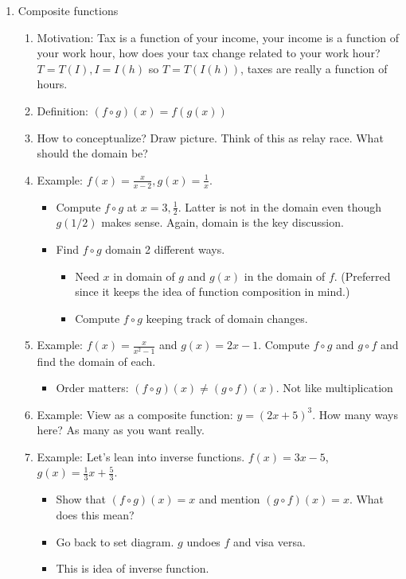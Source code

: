\documentclass{article}
\begin{document}
\begin{enumerate}
\item Composite functions
\begin{enumerate}
\item Motivation: Tax is a function of your income, your income is a function of your work hour, how does your tax change related to your work hour? $T=T(I), I=I(h)$ so $T=T(I(h))$, taxes are really a function of hours.
\item Definition: $(f\circ g)(x)=f(g(x))$ 
\item How to conceptualize? Draw picture. Think of this as relay race. What should the domain be?
\item Example: $f(x)=\frac{x}{x-2}, g(x) = \frac{1}{x}$.
\begin{itemize}
\item Compute $f\circ g$ at $x=3,\frac{1}{2}$. Latter is not in the domain even though $g(1/2)$ makes sense. Again, domain is the key discussion.
\item Find $f \circ g$ domain 2 different ways. 
\begin{itemize}
\item Need $x$ in domain of $g$ and $g(x)$ in the domain of $f$. (Preferred since it keeps the idea of function composition in mind.)
\item Compute $f\circ g$ keeping track of domain changes.
\end{itemize}
\end{itemize} 	
\item Example: $f(x)=\frac{x}{x^2-1}$ and $g(x)=2x-1$. Compute $f\circ g$ and $g\circ f$ and find the domain of each. 
\begin{itemize}
\item Order matters: $(f\circ g)(x)\neq (g\circ f)(x)$. Not like multiplication
\end{itemize}
\item Example: View as a composite function: $y = (2x+5)^3$. How many ways here? As many as you want really.
\item Example: Let's lean into inverse functions. $f(x) = 3x-5$, $g(x)=\frac{1}{3}x+\frac{5}{3}$.
\begin{itemize}
\item Show that $(f\circ g)(x)=x$ and mention $(g\circ f)(x)=x$. What does this mean? 
\item Go back to set diagram. $g$ undoes $f$ and visa versa. 
\item This is idea of inverse function.
\end{itemize}
\end{enumerate}
\end{enumerate}
\end{document}
